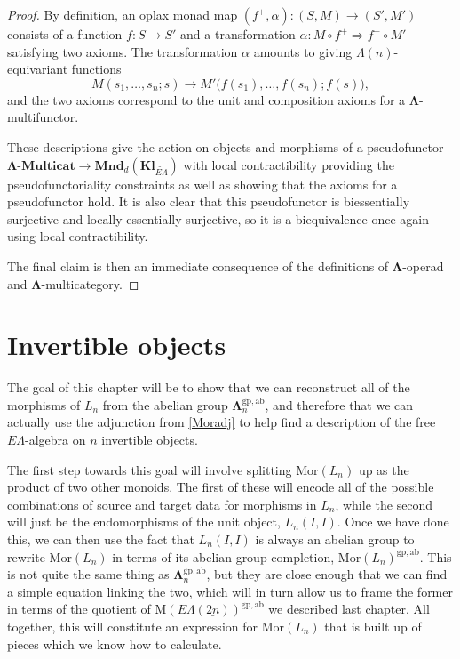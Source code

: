 \documentclass{amsbook} %
\newcommand{\mb}{\mathbf}
\newcommand{\MLn}{\mathbf{\Lambda}_n}
\newcommand{\MorLn}{\mathrm{Mor}(L_n)}
\newcommand{\ELnn}{E\Lambda(\underline{2n})}
\numberwithin{section}{chapter}
\begin{document}
\begin{proof}
By definition, an oplax monad map $(f^{+}, \alpha) \colon  (S,M) \to (S', M')$ consists of a function $f \colon S \to S'$ and a transformation $\alpha \colon M \circ f^{+} \Rightarrow f^{+} \circ M'$ satisfying two axioms.  The transformation $\alpha$ amounts to giving $\Lambda(n)$-equivariant functions
\[
M(s_1, \ldots, s_n; s) \to M'\big(f(s_1), \ldots, f(s_n); f(s)\big),
\]
and the two axioms correspond to the unit and composition axioms for a $\mb{\Lambda}$-multifunctor.

These descriptions give the action on objects and morphisms of a pseudofunctor $\mb{\Lambda}\mbox{-}\mb{Multicat} \to \mb{Mnd}_{d}(\mb{Kl}_{\widetilde{E\Lambda}})$ with local contractibility providing the pseudofunctoriality constraints as well as showing that the axioms for a pseudofunctor hold.  It is also clear that this pseudofunctor is biessentially surjective and locally essentially surjective, so it is a biequivalence once again using local contractibility.

The final claim is then an immediate consequence of the definitions of $\mb{\Lambda}$-operad and $\mb{\Lambda}$-multicategory.
\end{proof}


\chapter{Invertible objects}


The goal of this chapter will be to show that we can reconstruct all of the morphisms of $L_n$ from the abelian group $\MLn^{\mathrm{gp, ab}}$, and therefore that we can actually use the adjunction from \cref{Moradj} to help find a description of the free $E\Lambda$-algebra on $n$ invertible objects. 

The first step towards this goal will involve splitting $\MorLn$ up as the product of two other monoids. The first of these will encode all of the possible combinations of source and target data for morphisms in $L_n$, while the second will just be the endomorphisms of the unit object, $L_n(I, I)$. 
Once we have done this, we can then use the fact that $L_n(I, I)$ is always an abelian group to rewrite $\MorLn$ in terms of its abelian group completion, $\MorLn^{\mathrm{gp, ab}}$. This is not quite the same thing as $\MLn^{\mathrm{gp, ab}}$, but they are close enough that we can find a simple equation linking the two, which will in turn allow us to frame the former in terms of the quotient of $\mathrm{M}(\ELnn)^{\mathrm{gp, ab}}$ we described last chapter. All together, this will constitute an expression for $\MorLn$ that is built up of pieces which we know how to calculate.
\end{document}
